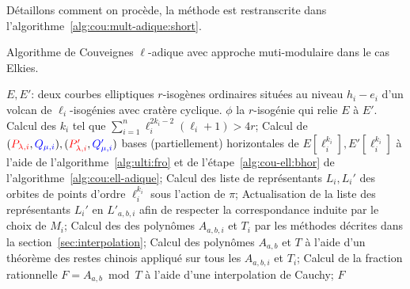 \documentclass[10pt,a4paper]{book}
\theoremstyle{plain}
\theoremstyle{definition}
\theoremstyle{definition}
\theoremstyle{definition}
\theoremstyle{definition}
\theoremstyle{remark}
\theoremstyle{remark}
\theoremstyle{definition}
\begin{document}
Détaillons comment on procède, la méthode est restranscrite dans 
l'algorithme~\ref{alg:cou:mult-adique:short}.%

\begin{algorithm}
\caption{\label{alg:cou:mult-adique:short} Algorithme de Couveignes $\ell$-adique avec approche muti-modulaire dans le cas Elkies.}
\begin{algorithmic}[1]
\REQUIRE $E,E'$: deux courbes elliptiques $r$-isogènes ordinaires situées au niveau $h_i-e_i$ d'un volcan de $\ell_i$-isogénies avec cratère cyclique.
\ENSURE $\phi$ la $r$-isogénie qui relie $E$ à $E'$.
\STATE Calcul des $k_i$ tel que $\sum_{i=1}^n\ell_{i}^{2k_{i}-2}(\ell_{i}+1)>4r$;
\STATE \label{alg:mult-ell:bhor} Calcul de $(\color{red}P_{\lambda,i}\color{black},\color{blue}Q_{\mu,i}\color{black}),(\color{red}P'_{\lambda,i}\color{black},\color{blue}Q_{\mu,i}'\color{black})$ bases (partiellement) horizontales de $E[\ell_i^{k_i}],E'[\ell_i^{k_i}]$ à l'aide de l'algorithme~\ref{alg:ulti:fro} et de l'étape~\ref{alg:cou-ell:bhor} de l'algorithme~\ref{alg:cou:ell-adique};
\STATE \label{alg:mult-ell:rep} Calcul des liste de représentants $L_i,L_i'$ des orbites de points d'ordre $\ell_i^{k_i}$ sous l'action de $\pi$;
\ENDFOR
{}
\STATE \label{alg:mult-ell:ord} Actualisation de la liste des représentants $L_i'$ en $L'_{a,b,i}$ afin de respecter la correspondance induite par le choix de $M_i$;
\STATE \label{alg:mult-ell:int} Calcul des des polynômes $A_{a,b,i}$ et $T_i$ par les méthodes décrites dans la section~\ref{sec:interpolation};
\ENDFOR
\STATE Calcul des polynômes $A_{a,b}$ et $T$ à l'aide d'un théorème des restes chinois appliqué sur tous les $A_{a,b,i}$ et $T_i$;
\STATE \label{alg:mult-ell:Cauchy} Calcul de la fraction rationnelle $F=A_{a,b} \bmod T$ à l'aide d'une interpolation de Cauchy;
\RETURN $F$
\ENDIF
\ENDFOR 
\end{algorithmic}
\end{algorithm}
\end{document}
